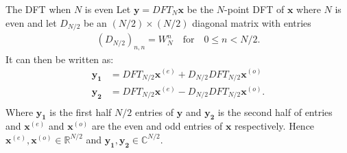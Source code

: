 \begin{theorem}{The DFT when $N$ is even}
    Let $\mathbf{y}=DFT_{N}\mathbf{x}$ be the $N$-point DFT of $\mathbf{x}$ where $N$ is even and let $D_{N/2}$ be an $(N/2)\times(N/2)$ diagonal matrix with entries 
    \begin{align}
        (D_{N/2})_{n,n}=W_N^n \quad \text{for} \quad 0 \leq n< N/2.
        \label{eq:DFTDiagonal}
    \end{align}
    It can then be written as:
    \begin{align*}
         \mathbf{y_1}&=DFT_{N/2}\mathbf{x}^{(e)}+D_{N/2}DFT_{N/2}\mathbf{x}^{(o)}\\ 
         \mathbf{y_2}&=DFT_{N/2}\mathbf{x}^{(e)}-D_{N/2}DFT_{N/2}\mathbf{x}^{(o)}.\\
    \end{align*}
    Where $\mathbf{y_1}$ is the first half $N/2$ entries of $\mathbf{y}$ and $\mathbf{y_2}$ is the second half of entries and $\mathbf{x}^{(e)}$ and $\mathbf{x}^{(o)}$ are the even and odd entries of $\mathbf{x}$ respectively. Hence $\mathbf{x}^{(e)},\mathbf{x}^{(o)}\in \mathds{R}^{N/2}$ and $\mathbf{y_1},\mathbf{y_2}\in \mathds{C}^{N/2}$. \cite[67]{ryan2019linear}
    \label{theo:DFT_N_even}
\end{theorem}
